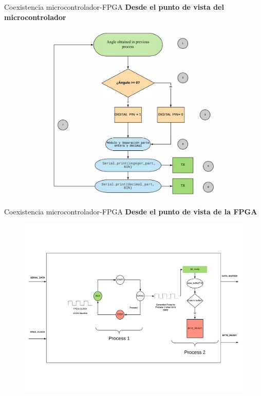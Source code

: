 \documentclass{beamer}
\begin{document}
\begin{frame}{Coexistencia microcontrolador-FPGA}
		\centering \textbf{Desde el punto de vista del microcontrolador}
		\begin{figure}[H]
			\center
			\includegraphics[trim = 0mm 0mm 0mm 0mm, clip,scale=0.3]{imagenes/Balancing_robot/extraccion_angulo.pdf}
		\end{figure}
\end{frame}

\begin{frame}{Coexistencia microcontrolador-FPGA}
\centering \textbf{Desde el punto de vista de la FPGA}
\begin{center}
	\begin{figure}[H]
		\center
		\includegraphics[trim = 0mm 0mm 0mm 10mm, clip,scale=0.4, angle=0]{imagenes/Balancing_robot/arduino_interfacefluid.pdf}

	\end{figure}
\end{center}
\end{frame}
\end{document}
